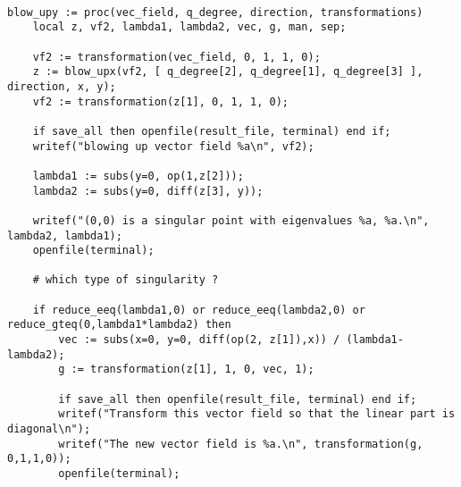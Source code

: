 \documentclass[a4paper,10pt]{article}
\begin{document}
\begin{lstlisting}[name=blowup]

blow_upy := proc(vec_field, q_degree, direction, transformations)
    local z, vf2, lambda1, lambda2, vec, g, man, sep;

    vf2 := transformation(vec_field, 0, 1, 1, 0);
    z := blow_upx(vf2, [ q_degree[2], q_degree[1], q_degree[3] ], direction, x, y);
    vf2 := transformation(z[1], 0, 1, 1, 0);

    if save_all then openfile(result_file, terminal) end if;
    writef("blowing up vector field %a\n", vf2);

    lambda1 := subs(y=0, op(1,z[2]));
    lambda2 := subs(y=0, diff(z[3], y));

    writef("(0,0) is a singular point with eigenvalues %a, %a.\n", lambda2, lambda1);
    openfile(terminal);

    # which type of singularity ?

    if reduce_eeq(lambda1,0) or reduce_eeq(lambda2,0) or reduce_gteq(0,lambda1*lambda2) then
        vec := subs(x=0, y=0, diff(op(2, z[1]),x)) / (lambda1-lambda2);
        g := transformation(z[1], 1, 0, vec, 1);

        if save_all then openfile(result_file, terminal) end if;
        writef("Transform this vector field so that the linear part is diagonal\n");
        writef("The new vector field is %a.\n", transformation(g, 0,1,1,0));
        openfile(terminal);


\end{lstlisting}
\end{document}
